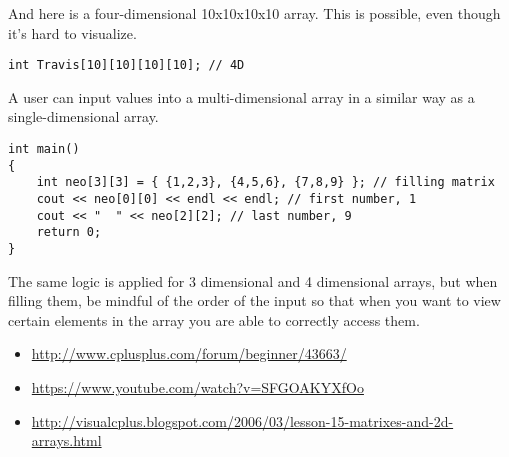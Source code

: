 And here is a four-dimensional 10x10x10x10 array. 
This is possible, even though it's hard to visualize.

\begin{lstlisting}
int Travis[10][10][10][10]; // 4D
\end{lstlisting}

A user can input values into a multi-dimensional array in a similar way as a single-dimensional array. 

\begin{lstlisting}
int main()
{
    int neo[3][3] = { {1,2,3}, {4,5,6}, {7,8,9} }; // filling matrix
    cout << neo[0][0] << endl << endl; // first number, 1
    cout << "  " << neo[2][2]; // last number, 9
    return 0;
}
\end{lstlisting}


	The same logic is applied for 3 dimensional and 4 dimensional arrays, but when filling them, be mindful of the order of the input so that when you want to view certain elements in the array you are able to correctly access them.






\begin{itemize}
\item \url{http://www.cplusplus.com/forum/beginner/43663/}
\item \url{https://www.youtube.com/watch?v=SFGOAKYXfOo}
\item \url{http://visualcplus.blogspot.com/2006/03/lesson-15-matrixes-and-2d-arrays.html}
\end{itemize}	